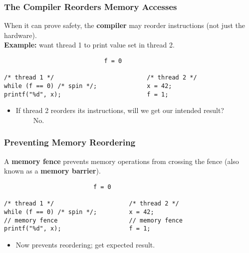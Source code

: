 \documentclass[aspectratio=43]{beamer}
\newenvironment{changemargin}[1]{%
  \begin{list}{}{%
    \setlength{\topsep}{0pt}%
    \setlength{\leftmargin}{#1}%
    \setlength{\rightmargin}{1em}
    \setlength{\listparindent}{\parindent}%
    \setlength{\itemindent}{\parindent}%
    \setlength{\parsep}{\parskip}%
  }%
  \item[]}{\end{list}}
\begin{document}
\begin{frame}[fragile]
  \frametitle{The Compiler Reorders Memory Accesses}

  \begin{changemargin}{1.5cm}
  When it can prove safety, the {\bf compiler} may reorder instructions (not just the hardware).\\[1em]

  {\bf Example:} want thread 1 to print value set in thread 2.

  \begin{lstlisting}
                            f = 0

/* thread 1 */                          /* thread 2 */
while (f == 0) /* spin */;              x = 42;
printf("%d", x);                        f = 1;
  \end{lstlisting}

  \begin{itemize}
    \item If thread 2 reorders its instructions, will we get our intended
      result?\\[1em]
     \alert{~~~~~No.}
  \end{itemize}
  \end{changemargin}
\end{frame}

\begin{frame}[fragile]
  \frametitle{Preventing Memory Reordering}

  \begin{changemargin}{1.5cm}
     A {\bf memory fence} prevents memory operations from crossing the
      fence (also known as a {\bf memory barrier}).

  \begin{lstlisting}
                         f = 0

/* thread 1 */                     /* thread 2 */
while (f == 0) /* spin */;         x = 42;
// memory fence                    // memory fence
printf("%d", x);                   f = 1;
  \end{lstlisting}

  \begin{itemize}
    \item Now prevents reordering; get expected result.
  \end{itemize}
  \end{changemargin}

\end{frame}
\end{document}
